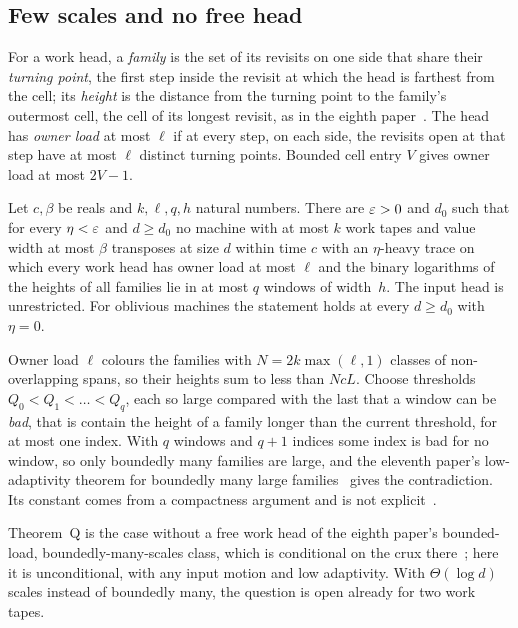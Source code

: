 \subsection{Few scales and no free head}

For a work head, a \emph{family} is the set of its revisits on one side that share their \emph{turning point}, the first step inside the
revisit at which the head is farthest from the cell; its \emph{height} is the distance from the turning point to the family's outermost
cell, the cell of its longest revisit, as in the eighth paper~\cite{EighthPaper2026}. The head has \emph{owner load} at most $\ell$ if
at every step, on each side, the revisits open at that step have at most $\ell$ distinct turning points. Bounded cell entry $V$ gives owner
load at most $2V-1$.

\begin{theorem}\label{thm:Q}
Let $c,\beta$ be reals and $k,\ell,q,h$ natural numbers. There are $\varepsilon>0$ and $d_0$ such that for every $\eta<\varepsilon$ and $d\ge d_0$ no machine with at
most $k$ work tapes and value width at most $\beta$ transposes at size $d$ within time $c$ with an $\eta$-heavy trace on which every work
head has owner load at most $\ell$ and the binary logarithms of the heights of all families lie in at most $q$ windows of width~$h$. The
input head is unrestricted. For oblivious machines the statement holds at every $d\ge d_0$ with $\eta=0$.
\end{theorem}

\begin{outline}
Owner load $\ell$ colours the families with $N=2k\max(\ell,1)$ classes of non-overlapping spans, so their heights sum to less than $NcL$. Choose
thresholds $Q_0<Q_1<\dots<Q_q$, each so large compared with the last that a window can be \emph{bad}, that is contain the height of a
family longer than the current threshold, for at most one index. With $q$ windows and $q+1$ indices some index is bad for no window, so
only boundedly many families are large, and the eleventh paper's low-adaptivity theorem for boundedly many large
families~\cite{MergeDepth2026} gives the contradiction. Its constant comes from a compactness argument and is not
explicit~\cite{SourceCovers2026}.
\end{outline}

Theorem~Q is the case without a free work head of the eighth paper's bounded-load, boundedly-many-scales class, which is
conditional on the crux there~\cite{EighthPaper2026}; here it is unconditional, with any input motion and low adaptivity. With
$\Theta(\log d)$ scales instead of boundedly many, the question is open already for two work tapes.
